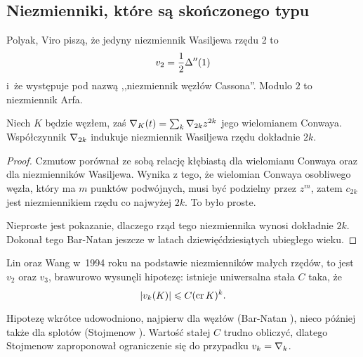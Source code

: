 
\subsection{Niezmienniki, które są skończonego typu}

Polyak, Viro \cite{polyak2001} piszą, że jedyny niezmiennik Wasiljewa rzędu 2 to
%
%
\begin{equation}
    v_2 = \frac 12 \Delta''(1)
\end{equation}
i~że występuje pod nazwą ,,niezmiennik węzłów Cassona''.
%
Modulo $2$ to niezmiennik Arfa.
%

\begin{example}
%
    Niech $K$ będzie węzłem, zaś $\nabla_K(t) = \sum_k \nabla_{2k} z^{2k}$ jego wielomianem Conwaya.
    Współczynnik $\nabla_{2k}$ indukuje niezmiennik Wasiljewa rzędu dokładnie $2k$.
\end{example}

\begin{proof}
    Czmutow \cite{chmutov2012} porównał ze sobą relację kłębiastą dla wielomianu Conwaya oraz dla niezmienników Wasiljewa.
    Wynika z tego, że wielomian Conwaya osobliwego węzła, który ma $m$ punktów podwójnych, musi być podzielny przez $z^m$, zatem $c_{2k}$ jest niezmiennikiem rzędu co najwyżej $2k$.
    To było proste.
%

    Nieproste jest pokazanie, dlaczego rząd tego niezmiennika wynosi dokładnie $2k$.
    Dokonał tego Bar-Natan \cite{barnatan1991} jeszcze w latach dziewięćdziesiątych ubiegłego wieku.
%
\end{proof}

Lin oraz Wang \cite{wang1996} w~1994 roku na podstawie niezmienników małych rzędów, to jest $v_2$ oraz $v_3$, brawurowo wysunęli hipotezę: istnieje uniwersalna stała $C$ taka, że
%
%
%
\begin{equation}
    |v_k(K)| \leqslant C (\operatorname{cr} K)^k.
\end{equation}

Hipotezę wkrótce udowodniono, najpierw dla węzłów (Bar-Natan \cite{barnatan1995}), nieco później także dla splotów (Stojmenow \cite{stoimenowa2001}).
%
%
Wartość stałej $C$ trudno obliczyć, dlatego Stojmenow \cite[problem 1.17]{ohtsuki2002} zaproponował ograniczenie się do przypadku $v_k = \nabla_k$.


